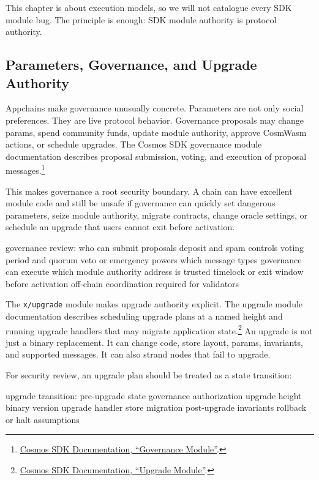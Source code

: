 This chapter is about execution models, so we will not catalogue every SDK module bug. The principle is enough: SDK module authority is protocol authority.

\subsection{Parameters, Governance, and Upgrade Authority}

Appchains make governance unusually concrete. Parameters are not only social preferences. They are live protocol behavior. Governance proposals may change params, spend community funds, update module authority, approve CosmWasm actions, or schedule upgrades. The Cosmos SDK governance module documentation describes proposal submission, voting, and execution of proposal messages.\footnote{\href{https://cosmos-docs.mintlify.app/sdk/latest/modules/gov/README}{Cosmos SDK Documentation, ``Governance Module''}.}

This makes governance a root security boundary. A chain can have excellent module code and still be unsafe if governance can quickly set dangerous parameters, seize module authority, migrate contracts, change oracle settings, or schedule an upgrade that users cannot exit before activation.

\begin{codeblock}
governance review:
    who can submit proposals
    deposit and spam controls
    voting period and quorum
    veto or emergency powers
    which message types governance can execute
    which module authority address is trusted
    timelock or exit window before activation
    off-chain coordination required for validators
\end{codeblock}

The \texttt{x/upgrade} module makes upgrade authority explicit. The upgrade module documentation describes scheduling upgrade plans at a named height and running upgrade handlers that may migrate application state.\footnote{\href{https://cosmos-docs.mintlify.app/sdk/latest/modules/upgrade/README}{Cosmos SDK Documentation, ``Upgrade Module''}.} An upgrade is not just a binary replacement. It can change code, store layout, params, invariants, and supported messages. It can also strand nodes that fail to upgrade.

For security review, an upgrade plan should be treated as a state transition:

\begin{codeblock}
upgrade transition:
    pre-upgrade state
    governance authorization
    upgrade height
    binary version
    upgrade handler
    store migration
    post-upgrade invariants
    rollback or halt assumptions
\end{codeblock}

